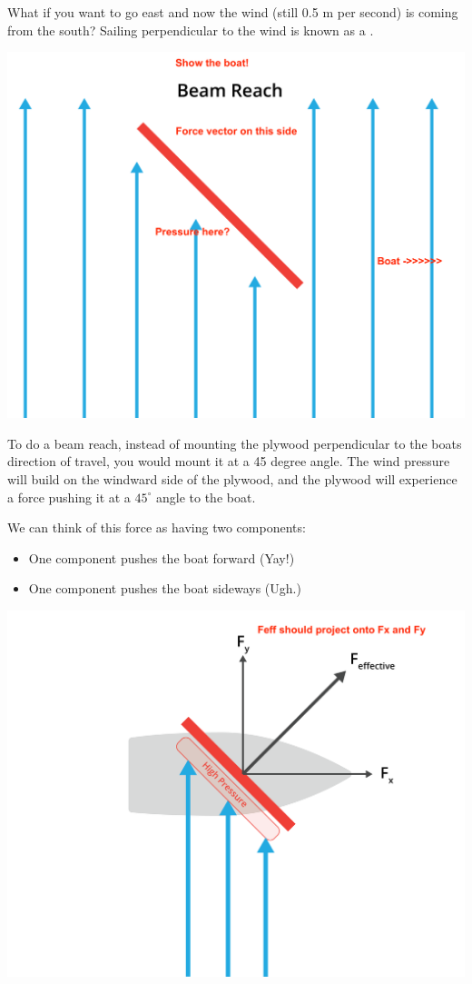 What if you want to go east and now the wind (still 0.5 m per second) is coming from the south?  Sailing perpendicular to the wind is known as a .

\includegraphics[width=.75\textwidth]{beamReach.png}


To do a beam reach,  instead of mounting the plywood perpendicular to the boats direction of travel,  you would mount it at a 45 degree angle.   The wind pressure will build on the windward
side of the plywood,  and the plywood will experience a force pushing it at a $45^\circ$ angle to the boat.

We can think of this force as having two components: 
\begin{itemize}
\item One component pushes the boat forward (Yay!)
\item One component pushes the boat sideways (Ugh.)
\end{itemize}
\includegraphics[width=.75\textwidth]{pressure.png}

